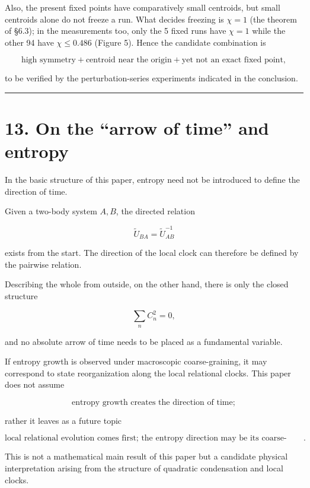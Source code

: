\documentclass[
  a4paper,
]{article}
\begin{document}
Also, the present fixed points have comparatively small centroids, but
small centroids alone do not freeze a run. What decides freezing is
\(\chi=1\) (the theorem of §6.3); in the measurements too, only the 5
fixed runs have \(\chi=1\) while the other 94 have \(\chi\le0.486\)
(Figure 5). Hence the candidate combination is

\[
\boxed{
\text{high symmetry}
+
\text{centroid near the origin}
+
\text{yet not an exact fixed point}
},
\]

to be verified by the perturbation-series experiments indicated in the
conclusion.

\begin{center}\rule{0.5\linewidth}{0.5pt}\end{center}

\section{13. On the ``arrow of time'' and
entropy}\label{on-the-arrow-of-time-and-entropy}

In the basic structure of this paper, entropy need not be introduced to
define the direction of time.

Given a two-body system \(A,B\), the directed relation

\[
\tilde U_{BA}
=
\tilde U_{AB}^{-1}
\]

exists from the start. The direction of the local clock can therefore be
defined by the pairwise relation.

Describing the whole from outside, on the other hand, there is only the
closed structure

\[
\sum_nC_n^2=0,
\]

and no absolute arrow of time needs to be placed as a fundamental
variable.

If entropy growth is observed under macroscopic coarse-graining, it may
correspond to state reorganization along the local relational clocks.
This paper does not assume

\[
\boxed{
\text{entropy growth creates the direction of time}
};
\]

rather it leaves as a future topic

\[
\boxed{
\text{local relational evolution comes first; the entropy direction may be its coarse-grained image}
}.
\]

This is not a mathematical main result of this paper but a candidate
physical interpretation arising from the structure of quadratic
condensation and local clocks.
\end{document}
